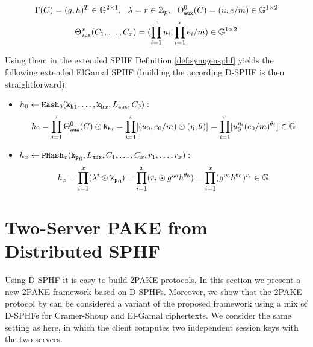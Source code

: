 \[ \Gamma(C)= (g,h)^T \in \mathbb{G}^{2\times 1},~~ {\lambda}=r\in\mathbb{Z}_p,~~ \Theta^0_{\mathtt{aux}}(C)=(u,e/m)\in\mathbb{G}^{1\times 2} \]
\[ \Theta^x_{\mathtt{aux}}(C_1,\dots,C_x)=(\prod^x_{i=1}u_{i},\prod^x_{i=1}e_i/m)\in\mathbb{G}^{1\times 2} \]

\noindent
Using them in the extended \ac{SPHF} Definition \ref{def:symgensphf} yields the following extended ElGamal \ac{SPHF} (building the according \ac{D-SPHF} is then straightforward):
\begin{itemize}
	\item $h_0\gets\mathtt{Hash}_0(\mathtt{k_h}_1,\dots,\mathtt{k_h}_x,L_\mathtt{aux},C_0):$
	 $$h_0=\prod_{i=1}^x\Theta_\mathtt{aux}^0(C) \odot \mathtt{k_h}_i = \prod_{i=1}^x [(u_0,e_0/m) \odot (\eta,\theta)] =\prod_{i=1}^x [u_0^{\eta_i}(e_0/m)^{\theta_i}]\in\mathbb{G}$$
	
	\item $h_x\gets\mathtt{PHash}_x(\mathtt{k_p}_0,L_\mathtt{aux},C_1,\dots,C_x,r_1,\dots,r_x):$
	$$h_x = \prod_{i=1}^x (\lambda^i \odot \mathtt{k_p}_0) = \prod_{i=1}^x (r_i \odot g^{\eta_0}h^{\theta_0}) = \prod_{i=1}^x (g^{\eta_0}h^{\theta_0})^{r_i} \in\mathbb{G}$$
\end{itemize}



\section{Two-Server PAKE from Distributed SPHF}\label{sec:twoserverpake}
Using \ac{D-SPHF} it is easy to build \ac{2PAKE} protocols.
In this section we present a new \ac{2PAKE} framework based on \acp{D-SPHF}.
Moreover, we show that the \ac{2PAKE} protocol by \citet{Katz2012a} can be considered a variant of the proposed framework using a mix of \acp{D-SPHF} for Cramer-Shoup and El-Gamal ciphertexts.
We consider the same setting as \citet{Katz2012a} here, in which the client computes two independent session keys with the two servers.

